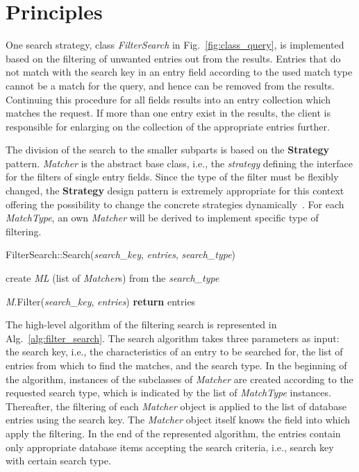 \documentclass[a4paper,twoside]{tce}
\newcommand{\param}{\emph}
\newcommand{\var}{\emph}
\newcommand{\algoreturn}{\textbf{return} }
\newcommand{\algolinenumbering}{1}
\begin{document}
\section{Principles}

One search strategy, class \emph{FilterSearch} in
Fig.~\ref{fig:class_query}, is implemented based on the filtering of
unwanted entries out from the results. Entries that do not match with
the search key in an entry field according to the used match type
cannot be a match for the query, and hence can be removed from the
results. Continuing this procedure for all fields results into an
entry collection which matches the request. If more than one entry
exist in the results, the client is responsible for enlarging on the
collection of the appropriate entries further.

The division of the search to the smaller subparts is based on the
\textbf{Strategy} pattern. \emph{Matcher} is the abstract base
class, i.e., the \emph{strategy} defining the interface for the
filters of single entry fields. Since the type of the filter must be
flexibly changed, the \textbf{Strategy} design pattern is extremely
appropriate for this context offering the possibility to change the
concrete strategies dynamically~\cite{DesignPatterns}. For each
\emph{MatchType}, an own \emph{Matcher} will be derived to implement
specific type of filtering.

\begin{algorithm}[b]
\caption{FilterSearch::Search(\param{search\_key}, \param{entries},
                              \param{search\_type})}
\label{alg:filter_search}
\begin{algorithmic}[\algolinenumbering]
\STATE create \var{ML} (list of \emph{Matcher}s) from the \param{search\_type}

\FORALL{matchers \var{M} in the \var{ML}}
  \STATE \var{M}.Filter(\param{search\_key}, \param{entries})
\ENDFOR
\STATE \algoreturn entries
\end{algorithmic}
\end{algorithm}

The high-level algorithm of the filtering search is represented in
Alg.~\ref{alg:filter_search}. The search algorithm takes three
parameters as input: the search key, i.e., the characteristics of an
entry to be searched for, the list of entries from which to find the
matches, and the search type. In the beginning of the algorithm,
instances of the subclasses of \emph{Matcher} are created according
to the requested search type, which is indicated by the list of
\emph{MatchType} instances.  Thereafter, the filtering of each
\emph{Matcher} object is applied to the list of database entries
using the search key. The \emph{Matcher} object itself knows the
field into which apply the filtering. In the end of the represented
algorithm, the entries contain only appropriate database items
accepting the search criteria, i.e., search key with certain search
type.
\end{document}
